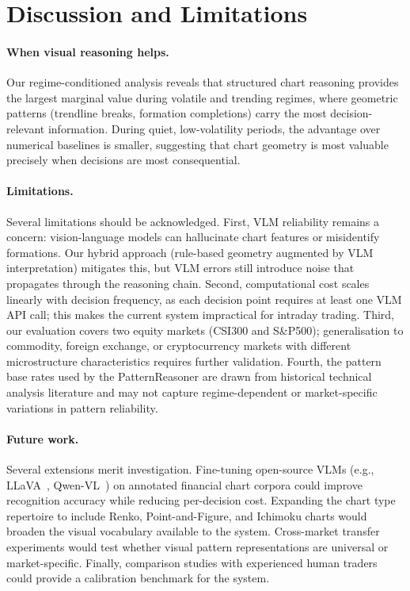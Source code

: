 \section{Discussion and Limitations}
\label{sec:discussion}

\paragraph{When visual reasoning helps.}
Our regime-conditioned analysis reveals that structured chart reasoning provides the largest marginal value during volatile and trending regimes, where geometric patterns (trendline breaks, formation completions) carry the most decision-relevant information. During quiet, low-volatility periods, the advantage over numerical baselines is smaller, suggesting that chart geometry is most valuable precisely when decisions are most consequential.

\paragraph{Limitations.}
Several limitations should be acknowledged. First, VLM reliability remains a concern: vision-language models can hallucinate chart features or misidentify formations. Our hybrid approach (rule-based geometry augmented by VLM interpretation) mitigates this, but VLM errors still introduce noise that propagates through the reasoning chain. Second, computational cost scales linearly with decision frequency, as each decision point requires at least one VLM API call; this makes the current system impractical for intraday trading. Third, our evaluation covers two equity markets (CSI300 and S\&P500); generalisation to commodity, foreign exchange, or cryptocurrency markets with different microstructure characteristics requires further validation. Fourth, the pattern base rates used by the PatternReasoner are drawn from historical technical analysis literature and may not capture regime-dependent or market-specific variations in pattern reliability.

\paragraph{Future work.}
Several extensions merit investigation. Fine-tuning open-source VLMs (e.g., LLaVA~\cite{liu2024llava}, Qwen-VL~\cite{bai2023qwenvl}) on annotated financial chart corpora could improve recognition accuracy while reducing per-decision cost. Expanding the chart type repertoire to include Renko, Point-and-Figure, and Ichimoku charts would broaden the visual vocabulary available to the system. Cross-market transfer experiments would test whether visual pattern representations are universal or market-specific. Finally, comparison studies with experienced human traders could provide a calibration benchmark for the system.

